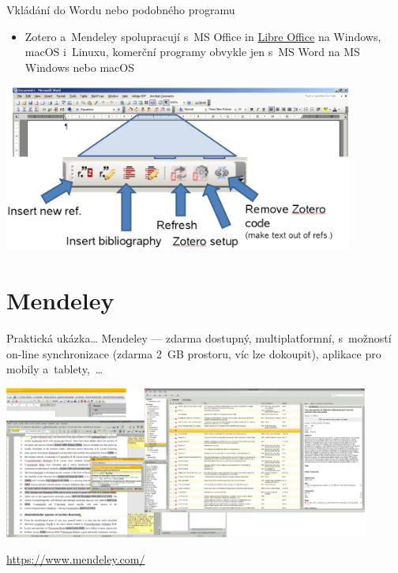 \documentclass[compress, ucs, xelatex, 11pt, xcolor=svgnames, aspectratio=169,
	hyperref={
		bookmarks=true,
		unicode=true,
		colorlinks=true,
		pdftitle={Citacni software},
		plainpages=false,
		pdfauthor={Vojtech Zeisek},
		pdfsubject={Kratky uvod do citacniho software},
		pdfcreator={XeLaTeX},
		pdfkeywords={citace, reference, software, literatura},
		linkcolor=Crimson, %
		anchorcolor=Magenta, %
		citecolor=Magenta, %
		filecolor=Magenta, %
		menucolor=Magenta, %
		urlcolor=DarkTurquoise, %
		pdftex},
	url={hyphens, lowtilde} %
	]{beamer}
\begin{document}
\begin{frame}{Vkládání do Wordu nebo podobného programu}
	\begin{itemize}
		\item Zotero a~Mendeley spolupracují s~MS Office in \href{https://cs.libreoffice.org/}{Libre Office} na Windows, macOS i~Linuxu, komerční programy obvykle jen s~MS Word na MS Windows nebo macOS
	\end{itemize}
	\begin{center}
		\includegraphics[height=5.5cm]{zotero_lista.png}
	\end{center}
\end{frame}

\section{Mendeley}

\begin{frame}{Praktická ukázka\ldots}
	Mendeley --- zdarma dostupný, multiplatformní, s~možností on-line synchronizace (zdarma 2~GB prostoru, víc lze dokoupit), aplikace pro mobily a~tablety,~\ldots\\
	\begin{center}
		\includegraphics[height=5cm]{mendeley.png}
	\end{center}
	\flushright\url{https://www.mendeley.com/}
\end{frame}
\end{document}
